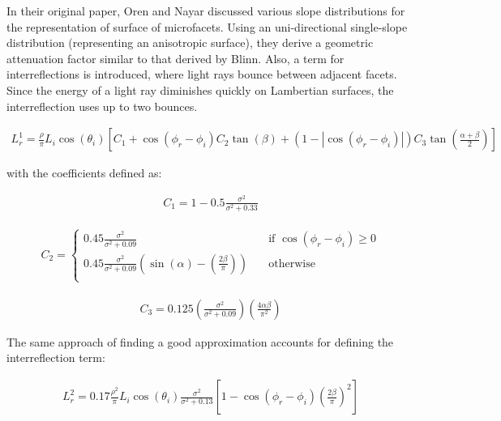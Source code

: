 In their original paper, Oren and Nayar discussed various slope distributions for the representation of surface of microfacets. Using an uni-directional single-slope distribution (representing an anisotropic surface), they derive a geometric attenuation factor similar to that derived by Blinn. Also, a term for interreflections is introduced, where light rays bounce between adjacent facets. Since the energy of a light ray diminishes quickly on Lambertian surfaces, the interreflection uses up to two bounces. 



	\begin{eqnarray*}
		L_r^1 = \frac{\rho}{\pi}L_i\cos(\theta_i)\left[C_1+\cos(\phi_r-\phi_i)C_2\tan(\beta)+
			(1-|\cos(\phi_r-\phi_i)|)C_3\tan\left(\frac{\alpha+\beta}{2}\right)\right]
	\end{eqnarray*}

with the coefficients defined as:

	\begin{eqnarray*}
		C_1 = 1 - 0.5\frac{\sigma^2}{\sigma^2+0.33}
	\end{eqnarray*}

	\begin{eqnarray*}
		C_2 =
			\begin{cases}
				0.45\frac{\sigma^2}{\sigma^2+0.09} 		& \quad \text{if $\cos(\phi_r - \phi_i) \geq 0$}\\
				0.45\frac{\sigma^2}{\sigma^2+0.09} \left( \sin(\alpha) - \left( \frac{2\beta}{\pi}\right)\right) 	& \quad \text{otherwise}\\
			\end{cases}
	\end{eqnarray*}

	\begin{eqnarray*}
		C_3 = 0.125 \left( \frac{\sigma^2}{\sigma^2+0.09} \right)\left( \frac{4\alpha\beta}{\pi^2} \right)
	\end{eqnarray*}

The same approach of finding a good approximation accounts for defining the interreflection term:

	\begin{eqnarray*}
		L_r^2 = 0.17\frac{\rho^2}{\pi}L_i\cos(\theta_i)\frac{\sigma^2}{\sigma^2+0.13}\left[1-\cos(\phi_r-\phi_i)\left( \frac{2\beta}{\pi} \right)^2 \right]
	\end{eqnarray*}

